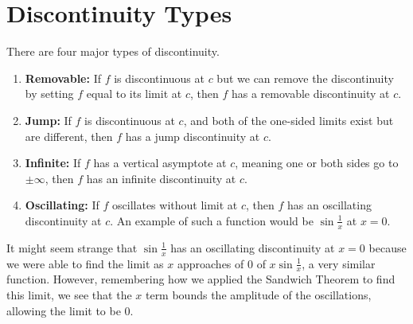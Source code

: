 \section{Discontinuity Types}
There are four major types of discontinuity.
\begin{enumerate}[label=]
	\item \textbf{Removable: } If $f$ is discontinuous at $c$ but we can remove the discontinuity by setting $f$ equal to its limit at $c$, then $f$ has a removable discontinuity at $c$.
	\item \textbf{Jump: } If $f$ is discontinuous at $c$, and both of the one-sided limits exist but are different, then $f$ has a jump discontinuity at $c$.
	\item \textbf{Infinite: } If $f$ has a vertical asymptote at $c$, meaning one or both sides go to $\pm\infty$, then $f$ has an infinite discontinuity at $c$.
	\item \textbf{Oscillating: } If $f$ oscillates without limit at $c$, then $f$ has an oscillating discontinuity at $c$. An example of such a function would be $\sin{\frac{1}{x}}$ at $x=0$.
\end{enumerate}


It might seem strange that $\sin{\frac{1}{x}}$ has an oscillating discontinuity at $x=0$ because we were able to find the limit as $x$ approaches of 0 of $x\sin{\frac{1}{x}}$, a very similar function.
However, remembering how we applied the Sandwich Theorem to find this limit, we see that the $x$ term bounds the amplitude of the oscillations, allowing the limit to be $0$.


